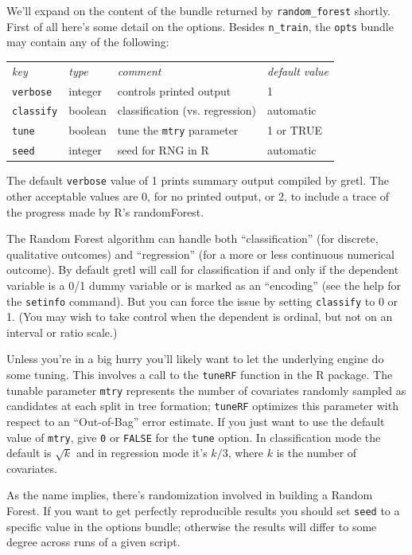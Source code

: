 \documentclass{article}
\begin{document}
We'll expand on the content of the bundle returned by
\texttt{random\_forest} shortly. First of all here's some detail on
the options. Besides \texttt{n\_train}, the \texttt{opts} bundle may
contain any of the following:

\begin{center}
\begin{tabular}{llll}
  \textit{key} & \textit{type} & \textit{comment} & \textit{default value} \\[4pt]
  \texttt{verbose} & integer & controls printed output & 1 \\
  \texttt{classify} & boolean & classification (vs. regression) & automatic\\
  \texttt{tune} & boolean & tune the \texttt{mtry} parameter & 1 or TRUE \\
  \texttt{seed} & integer & seed for RNG in \textsf{R} & automatic
\end{tabular}
\end{center}

The default \texttt{verbose} value of 1 prints summary output compiled
by gretl. The other acceptable values are 0, for no printed output, or
2, to include a trace of the progress made by \textsf{R}'s
\textsf{randomForest}.

The Random Forest algorithm can handle both ``classification'' (for
discrete, qualitative outcomes) and ``regression'' (for a more or less
continuous numerical outcome). By default gretl will call for
classification if and only if the dependent variable is a 0/1 dummy
variable or is marked as an ``encoding'' (see the help for the
\texttt{setinfo} command).  But you can force the issue by setting
\texttt{classify} to 0 or 1. (You may wish to take control when the
dependent is ordinal, but not on an interval or ratio scale.)

Unless you're in a big hurry you'll likely want to let the underlying
engine do some tuning. This involves a call to the \texttt{tuneRF}
function in the \textsf{R} package. The tunable parameter
\texttt{mtry} represents the number of covariates randomly sampled as
candidates at each split in tree formation; \texttt{tuneRF} optimizes
this parameter with respect to an ``Out-of-Bag'' error estimate.  If
you just want to use the default value of \texttt{mtry}, give
\texttt{0} or \texttt{FALSE} for the \texttt{tune} option. In
classification mode the default is $\sqrt{k}$ and in regression mode
it's $k/3$, where $k$ is the number of covariates.

As the name implies, there's randomization involved in building a
Random Forest. If you want to get perfectly reproducible results you
should set \texttt{seed} to a specific value in the options bundle;
otherwise the results will differ to some degree across runs of a
given script.
\end{document}
